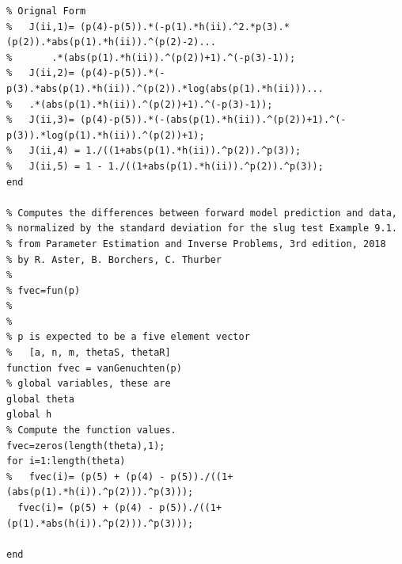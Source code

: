 \documentclass{article}
\begin{document}
\begin{verbatim}
% Orignal Form
%   J(ii,1)= (p(4)-p(5)).*(-p(1).*h(ii).^2.*p(3).*(p(2)).*abs(p(1).*h(ii)).^(p(2)-2)...
%       .*(abs(p(1).*h(ii)).^(p(2))+1).^(-p(3)-1));
%   J(ii,2)= (p(4)-p(5)).*(-p(3).*abs(p(1).*h(ii)).^(p(2)).*log(abs(p(1).*h(ii)))...
%   .*(abs(p(1).*h(ii)).^(p(2))+1).^(-p(3)-1));
%   J(ii,3)= (p(4)-p(5)).*(-(abs(p(1).*h(ii)).^(p(2))+1).^(-p(3)).*log(p(1).*h(ii)).^(p(2))+1);
%   J(ii,4) = 1./((1+abs(p(1).*h(ii)).^p(2)).^p(3));
%   J(ii,5) = 1 - 1./((1+abs(p(1).*h(ii)).^p(2)).^p(3));
end

% Computes the differences between forward model prediction and data,
% normalized by the standard deviation for the slug test Example 9.1.
% from Parameter Estimation and Inverse Problems, 3rd edition, 2018
% by R. Aster, B. Borchers, C. Thurber
%
% fvec=fun(p)
%
%
% p is expected to be a five element vector
%   [a, n, m, thetaS, thetaR]
function fvec = vanGenuchten(p)
% global variables, these are 
global theta
global h
% Compute the function values.
fvec=zeros(length(theta),1);
for i=1:length(theta)
%   fvec(i)= (p(5) + (p(4) - p(5))./((1+(abs(p(1).*h(i)).^p(2))).^p(3)));
  fvec(i)= (p(5) + (p(4) - p(5))./((1+(p(1).*abs(h(i)).^p(2))).^p(3)));

end  

\end{verbatim}
\end{document}
